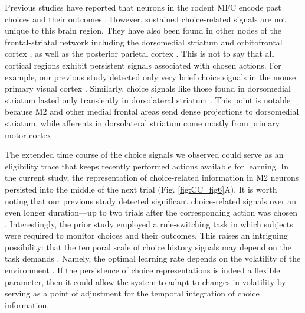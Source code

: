 Previous studies have reported that neurons in the rodent MFC encode past choices \citep{sul2011role, siniscalchi2016fast} and their outcomes \citep{kargo2007adaptation, sul2011role, yuan2014cortical}. However, sustained choice-related signals are not unique to this brain region. They have also been found in other nodes of the frontal-striatal network including the dorsomedial striatum \citep{kim2013signals} and orbitofrontal cortex \citep{sul2010distinct}, as well as the posterior parietal cortex \citep{hwang2017history}. This is not to say that all cortical regions exhibit persistent signals associated with chosen actions. For example, our previous study detected only very brief choice signals in the mouse primary visual cortex \citep{siniscalchi2016fast}. Similarly, choice signals like those found in dorsomedial striatum lasted only transiently in dorsolateral striatum \citep{kim2013signals}. This point is notable because M2 and other medial frontal areas send dense projections to dorsomedial striatum, while afferents in dorsolateral striatum come mostly from primary motor cortex \citep{reep1999topographic}.

The extended time course of the choice signals we observed could serve as an eligibility trace that keeps recently performed actions available for learning. In the current study, the representation of choice-related information in M2 neurons persisted into the middle of the next trial (Fig. \ref{fig:CC_fig6}A). It is worth noting that our previous study detected significant choice-related signals over an even longer duration—up to two trials after the corresponding action was chosen \citep{siniscalchi2016fast}. Interestingly, the prior study employed a rule-switching task in which subjects were required to monitor choices and their outcomes. This raises an intriguing possibility: that the temporal scale of choice history signals may depend on the task demands \citep{bernacchia2011reservoir, donahue2013cortical}. Namely, the optimal learning rate depends on the volatility of the environment \citep{behrens2007learning, farashahi2017metaplasticity}. If the persistence of choice representations is indeed a flexible parameter, then it could allow the system to adapt to changes in volatility by serving as a point of adjustment for the temporal integration of choice information.

